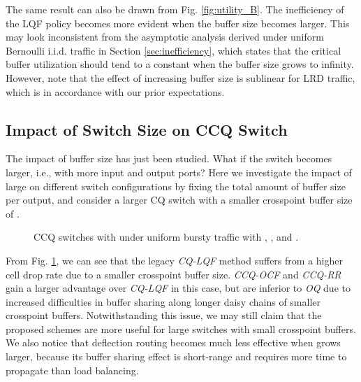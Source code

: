 \documentclass[journal,final,doublecolumn,10pt,twoside]{IEEEtranTCOM} \normalsize
\begin{document}
The same result can also be drawn from Fig. \ref{fig:utility_B}. The inefficiency of the LQF policy becomes more evident when the buffer size becomes larger. This may look inconsistent from the asymptotic analysis derived under uniform Bernoulli i.i.d. traffic in Section \ref{sec:inefficiency}, which states that the critical buffer utilization should tend to a constant when the buffer size grows to infinity. However, note that the effect of increasing buffer size is sublinear for LRD traffic, which is in accordance with our prior expectations.


\subsection{Impact of Switch Size on CCQ Switch}

The impact of buffer size has just been studied. What if the switch becomes larger, i.e., with more input and output ports? Here we investigate the impact of large  on different switch configurations by fixing the total amount of buffer size per output, and consider a larger  CQ switch with a smaller crosspoint buffer size of .



\begin{figure}[ht]
\begin{minipage}[t]{3.2 in}
\centering {}
\end{minipage}
\begin{minipage}[t]{3.2 in}
\centering {}
\end{minipage}
\caption{ CCQ switches with  under uniform bursty traffic with , , and .}
\label{fig:N}
\end{figure}


From Fig. \ref{fig:N}, we can see that the legacy \emph{CQ-LQF} method suffers from a higher cell drop rate due to a smaller crosspoint buffer size. \emph{CCQ-OCF} and \emph{CCQ-RR} gain a larger advantage over \emph{CQ-LQF} in this case, but are inferior to \emph{OQ} due to increased difficulties in buffer sharing along longer daisy chains of smaller crosspoint buffers. Notwithstanding this issue, we may still claim that the proposed schemes are more useful for large switches with small crosspoint buffers. We also notice that deflection routing becomes much less effective when  grows larger, because its buffer sharing effect is short-range and requires more time to propagate than load balancing.
\end{document}
